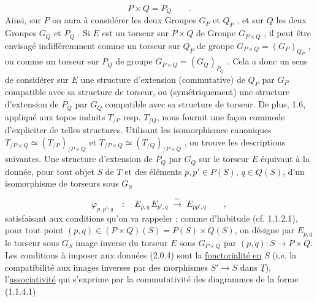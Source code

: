 \begin{equation}\tag{2.0.3}
P\times Q = P_Q \qquad .
\end{equation}
Ainsi, sur $P$ on  aura à considérer les deux Groupes $G_P$ et $Q_P$ , et sur $Q$ les deux Groupes $G_Q$ et $P_Q$ . Si $E$ est un torseur sur $P\times Q$ de Groupe $G_{P\times Q}$ , il peut être envisagé indifféremment comme un torseur sur $Q_P$ de groupe $G_{P\times Q} = (G_P)_{Q_P}$ , ou comme un torseur sur $P_Q$ de groupe $G_{P\times Q}=(G_Q)_{P_Q}$ . Cela a donc un sens de considérer sur $E$ une structure d'extension (commutative) de $Q_P$ par $G_P$ compatible avec sa structure de torseur, ou (symétriquement)
une structure d'extension de $P_Q$ par $G_Q$ compatible avec sa structure de torseur. De plus, 1.6, appliqué aux topos induits $T_{/P}$ resp. $T_{/Q}$, nous fournit une façon commode d'expliciter de telles structures. Utilisant les isomorphismes canoniques $T_{/P\times Q} \simeq (T_{/P})_{/P\times Q}$ et $T_{/P\times Q} \simeq (T_{/Q})_{/P\times Q}$ , on trouve les descriptions suivantes. Une structure d'extension de $P_Q$ par $G_Q$ sur le torseur $E$ équivaut à la donnée, pour tout objet $S$ de $\underline{T}$ et des éléments $p,p' \in P(S)$, $q \in Q(S)$, d'un isomorphisme de torseurs sous $G_S$

\begin{equation}\tag{2.0.4}
\varphi_{p,p';q} \quad : \quad E_{p,q}\,E_{p',q} \;\overset{\sim}{\longrightarrow}\; E_{pp',q} \qquad ,
\end{equation}
satisfaisant aux conditions qu'on va rappeler ; comme d'habitude (cf. 1.1.2.1), pour tout point $(p,q) \in (P\times Q)(S) = P(S)\times Q(S)$, on désigne par $E_{p,q}$ le torseur sous $G_S$ image inverse du torseur $E$ sous $G_{P\times Q}$ par $(p,q) : S \longrightarrow P\times Q$. Les conditions à imposer aux données (2.0.4) sont la \underline{fonctorialité en} $S$ (i.e. la compatibilité aux images inverses par des morphismes $S' \longrightarrow S$ dans $\underline{T}$), l'\underline{associativité} qui s'exprime par la commutativité des diagrammes de la forme (1.1.4.1)

